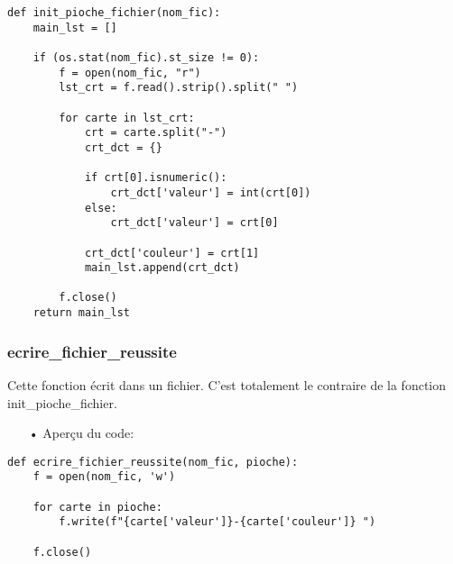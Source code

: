 	\lstset{language=Python}
	\lstset{frame=lines}
	\lstset{basicstyle=\footnotesize}
	\begin{lstlisting}
def init_pioche_fichier(nom_fic):
    main_lst = []

    if (os.stat(nom_fic).st_size != 0):
        f = open(nom_fic, "r") 
        lst_crt = f.read().strip().split(" ")

        for carte in lst_crt:
            crt = carte.split("-")
            crt_dct = {}
            
            if crt[0].isnumeric():
                crt_dct['valeur'] = int(crt[0])
            else:
                crt_dct['valeur'] = crt[0]

            crt_dct['couleur'] = crt[1]
            main_lst.append(crt_dct)

        f.close()
    return main_lst		

	\end{lstlisting} 
	
	\subsubsection{ecrire\_fichier\_reussite}
	Cette fonction écrit dans un fichier. C'est totalement le contraire de la fonction init\_pioche\_fichier.
	\\
	\begin{itemize}
	\color{blue}\item[•]Aperçu du code:
	\end{itemize}
	
	\lstset{language=Python}
	\lstset{frame=lines}
	\lstset{basicstyle=\footnotesize}
	\begin{lstlisting}
def ecrire_fichier_reussite(nom_fic, pioche):
    f = open(nom_fic, 'w')

    for carte in pioche:
        f.write(f"{carte['valeur']}-{carte['couleur']} ")

    f.close()	

	\end{lstlisting}
	
